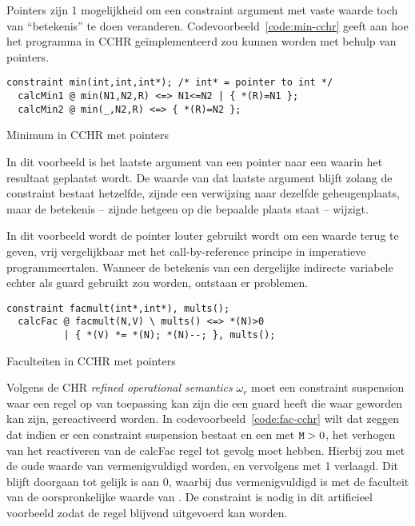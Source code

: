 Pointers zijn 1 mogelijkheid om een constraint argument met vaste waarde toch van ``betekenis'' te doen veranderen. Codevoorbeeld~\ref{code:min-cchr} geeft aan hoe het  programma in CCHR ge\"implementeerd zou kunnen worden met behulp van pointers.
\begin{exCode}
\begin{Verbatim}[frame=single]
  constraint min(int,int,int*); /* int* = pointer to int */
  calcMin1 @ min(N1,N2,R) <=> N1<=N2 | { *(R)=N1 };
  calcMin2 @ min(_,N2,R) <=> { *(R)=N2 };
\end{Verbatim}
\caption{Minimum in CCHR met pointers}
\label{code:min-cchr}
\end{exCode}

In dit voorbeeld is het laatste argument van  een pointer naar een  waarin het resultaat geplaatst wordt. De waarde van dat laatste argument blijft zolang de constraint bestaat hetzelfde, zijnde een verwijzing naar dezelfde geheugenplaats, maar de betekenis -- zijnde hetgeen op die bepaalde plaats staat -- wijzigt.

In dit voorbeeld wordt de pointer louter gebruikt wordt om een waarde terug te geven, vrij vergelijkbaar met het call-by-reference principe in imperatieve programmeertalen. Wanneer de betekenis van een dergelijke indirecte variabele echter als guard gebruikt zou worden, ontstaan er problemen.
\begin{exCode}
\begin{Verbatim}[frame=single]
  constraint facmult(int*,int*), mults();
  calcFac @ facmult(N,V) \ mults() <=> *(N)>0 
          | { *(V) *= *(N); *(N)--; }, mults();
\end{Verbatim}
\caption{Faculteiten in CCHR met pointers}
\label{code:fac-cchr}
\end{exCode}
Volgens de CHR {\em refined operational semantics} $\omega_r$ moet een constraint suspension waar een regel op van toepassing kan zijn die een guard heeft die waar geworden kan zijn, gereactiveerd worden. In codevoorbeeld~\ref{code:fac-cchr} wilt dat zeggen dat indien er een  constraint suspension bestaat en een  met ${\tt M} > 0$, het verhogen van  het reactiveren van de calcFac regel tot gevolg moet hebben. Hierbij zou  met de oude waarde van  vermenigvuldigd worden, en  vervolgens met 1 verlaagd. Dit blijft doorgaan tot  gelijk is aan $0$, waarbij  dus vermenigvuldigd is met de faculteit van de oorspronkelijke waarde van . De  constraint is nodig in dit artificieel voorbeeld zodat de  regel blijvend uitgevoerd kan worden.

